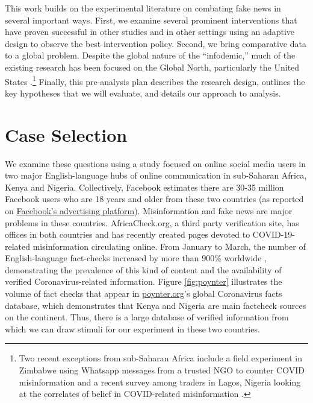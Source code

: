 \documentclass[letterpaper, 12pt, parskip=full,]{scrartcl}
\begin{document}
This work builds on the experimental literature on combating fake news in several important ways. First, we examine several prominent interventions that have proven successful in other studies and in other settings using an adaptive design to observe the best intervention policy. Second, we bring comparative data to a global problem. Despite the global nature of the ``infodemic,'' much of the existing research has been focused on the Global North, particularly the United States \citep{pennycook2020fighting, bursztyn2020misinformation}.\footnote{Two recent exceptions from sub-Saharan Africa include a field experiment in Zimbabwe using Whatsapp messages from a trusted NGO  to counter COVID misinformation \citep{bowles2020center} and a recent survey among traders in Lagos, Nigeria looking at the correlates of belief in COVID-related misinformation \citep{Grossman2020}.} Finally, this pre-analysis plan describes the research design, outlines the key hypotheses that we will evaluate, and details our approach to analysis.




\section{Case Selection}

We examine these questions using a study focused on online social media users in two major English-language hubs of online communication in sub-Saharan Africa, Kenya and Nigeria.  Collectively, Facebook estimates there are 30-35 million Facebook users who are 18 years and older from these two countries (as reported on \href{https://www.facebook.com/business/insights/tools/audience-insights?ref=ens_rdr}{Facebook's advertising platform}). Misinformation and fake news are major problems in these countries. AfricaCheck.org, a third party verification site, has offices in both countries and has recently created pages devoted to COVID-19-related misinformation circulating online. From January to March, the number of English-language fact-checks increased by more than 900\% worldwide \citep{brennen2020types}, demonstrating the prevalence of this kind of content and the availability of verified Coronavirus-related information.  Figure \ref{fig:poynter} illustrates the volume of fact checks that appear in \url{poynter.org}'s global Coronavirus facts database, which demonstrates that Kenya and Nigeria are main factcheck sources on the continent. Thus, there is a large database of verified information from which we can draw stimuli for our experiment in these two countries. 
\end{document}
